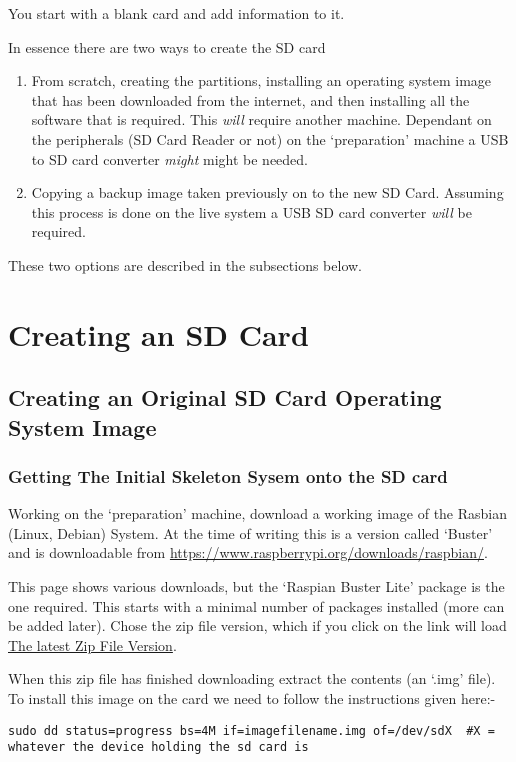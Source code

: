 \documentclass[Draft]{akc}
\begin{document}
You start with a blank card and add information to it.

In essence there are two ways to create the SD card
\begin{enumerate}
\item From scratch, creating the partitions, installing an operating system image that has been
downloaded from the internet, and then installing all the software that is required.  This
\emph{will} require another machine.  Dependant on the peripherals (SD Card Reader or not) on the
`preparation' machine a USB to SD card converter  \emph{might} might be needed.
\item Copying a backup image taken previously on to the new SD Card.  Assuming this process is done
on the live system a USB SD card converter \emph{will} be required.
\end{enumerate}

These two options are described in the subsections below.

\section{Creating an SD Card}
\subsection{Creating an Original SD Card Operating System Image}
\subsubsection{Getting The Initial Skeleton Sysem onto the SD card}
Working on the `preparation' machine, download a working image of the Rasbian (Linux, Debian) System.  At the time of writing
this is a version called `Buster' and is downloadable from
\url{https://www.raspberrypi.org/downloads/raspbian/}.

This page shows various downloads, but the `Raspian Buster Lite' package is the one required. This starts
with a minimal number of packages installed (more can be added later). Chose the zip file version,
which if you click on the link will load
\href{https://downloads.raspberrypi.org/raspbian_lite_latest} {The latest Zip File Version}.

When this zip file has finished downloading extract the contents (an `.img' file).
To install this image on the card we need to follow the instructions given here:-

\begin{lstlisting}
sudo dd status=progress bs=4M if=imagefilename.img of=/dev/sdX  #X = whatever the device holding the sd card is
\end{lstlisting}
\end{document}
